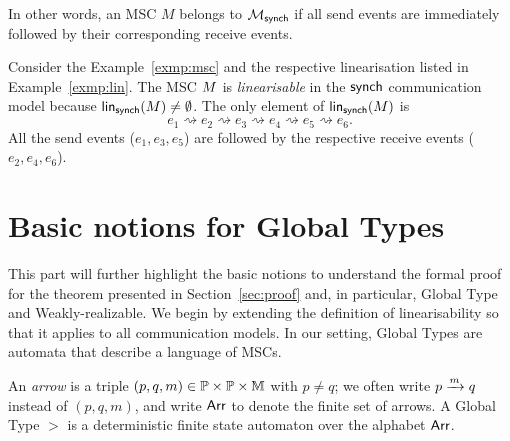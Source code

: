 In other words, an MSC $M$ belongs to $\mscsetofmodel{\synchmodel}$ if
all send events are immediately followed by their corresponding receive events.

\bigskip

\begin{example}
Consider the Example~\ref{exmp:msc} and the respective linearisation
listed in  Example~\ref{exmp:lin}. 
The MSC $\mmsc$ is \textit{linearisable} in the $\synchmodel$ communication 
model because
$\linearisationsof{\mmsc}{\synchmodel}\neq\emptyset$.
The only element of $\linearisationsof{\mmsc}{\synchmodel}$ is
$$e_1 \rightsquigarrow e_2 \rightsquigarrow e_3 \rightsquigarrow e_4
\rightsquigarrow e_5 \rightsquigarrow e_6.$$
All the send events ($e_1, e_3, e_5$) are followed by the respective
receive events ($e_2, e_4, e_6$).
\end{example}

\section{Basic notions for Global Types}
This part will further highlight the basic notions to understand the formal proof 
for the theorem presented in Section~\ref{sec:proof} and, in particular, Global Type
and Weakly-realizable. We begin by extending the definition of linearisability so 
that it applies to all communication models.
In our setting, Global Types are automata that describe a language of MSCs.


\bigskip

\begin{definition}
	An \emph{arrow} is a triple $(p,q,m)\in\Procs\times\Procs\times\Messages$ 
	with $p\ne q$; we often write $\marrow{p}{q}{m}$ instead of $(p,q,m)$, and 
	write $\labelalphabet$ to denote the finite set of arrows.
	A Global Type $\gt$ is a deterministic finite state automaton over the 
	alphabet $\labelalphabet$.
\end{definition}

\bigskip

